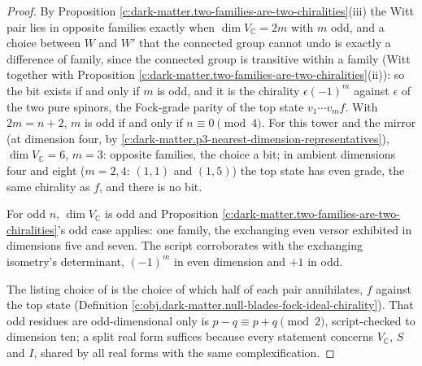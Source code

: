 \documentclass[11pt]{article}
\theoremstyle{definition}
\theoremstyle{plain}
\providecommand{\C}{}\renewcommand{\C}{\mathbb{C}}
\begin{document}
\begin{proof}
By Proposition \ref{c:dark-matter.two-families-are-two-chiralities}(iii) the Witt pair lies in opposite families exactly when $\dim V_{\C} = 2m$ with $m$ odd, and a choice between $W$ and $W'$ that the connected group cannot undo is exactly a difference of family, since the connected group is transitive within a family (Witt together with Proposition \ref{c:dark-matter.two-families-are-two-chiralities}(ii)): so the bit exists if and only if $m$ is odd, and it is the chirality $\epsilon(-1)^{m}$ against $\epsilon$ of the two pure spinors, the Fock-grade parity of the top state $v_{1}\cdots v_{m}f$. With $2m = n + 2$, $m$ is odd if and only if $n \equiv 0 \pmod 4$. For this tower and the mirror (at dimension four, by \ref{c:dark-matter.p3-nearest-dimension-representatives}), $\dim V_{\C} = 6$, $m = 3$: opposite families, the choice a bit; in ambient dimensions four and eight ($m = 2, 4$: $(1,1)$ and $(1,5)$) the top state has even grade, the same chirality as $f$, and there is no bit.

For odd $n$, $\dim V_{\C}$ is odd and Proposition \ref{c:dark-matter.two-families-are-two-chiralities}'s odd case applies: one family, the exchanging even versor exhibited in dimensions five and seven. The script corroborates with the exchanging isometry's determinant, $(-1)^{m}$ in even dimension and $+1$ in odd.

The listing choice of \cite[Prop.~5.6]{ButlerT12} is the choice of which half of each pair annihilates, $f$ against the top state (Definition \ref{c:obj.dark-matter.null-blades-fock-ideal-chirality}). That odd residues are odd-dimensional only is $p - q \equiv p + q \pmod 2$, script-checked to dimension ten; a split real form suffices because every statement concerns $V_{\C}$, $S$ and $I$, shared by all real forms with the same complexification.

\end{proof}
\end{document}
